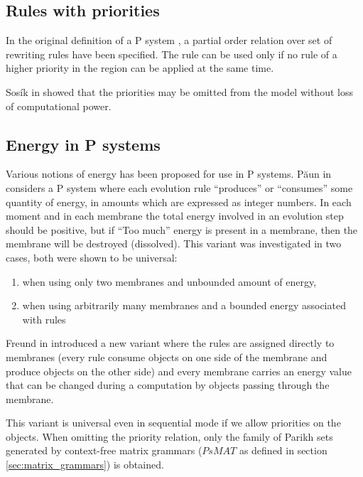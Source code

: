 
\subsection{Rules with priorities} %
\label{sub:rules_with_priorities}

In the original definition of a P system \cite{Paun98}, a partial order relation over set of rewriting rules have been specified. The rule can be used only if no rule of a higher priority in the region can be applied at the same time.

Sos\'ik in \cite{Sosik:2002:WithoutPriorities} showed that the priorities may be omitted from the model without loss of computational power.


\subsection{Energy in P systems} %
\label{sub:energy_in_p_systems}

Various notions of energy has been proposed for use in P systems. P\u{a}un in \cite{Paun:2001:Energy} considers a P system where each evolution rule ``produces'' or ``consumes'' some quantity of energy, in amounts which are expressed as integer numbers. In each moment and in each membrane the total energy involved in an evolution step should be positive, but if ``Too much'' energy is present in a membrane, then the membrane will be destroyed (dissolved). This variant was investigated in two cases, both were shown to be universal:

\begin{enumerate}
	\item when using only two membranes and unbounded amount of energy,
	\item when using arbitrarily many membranes and a bounded energy associated with rules
\end{enumerate}

Freund in \cite{Freund:2004:SequentialEnergy} introduced a new variant where the rules are assigned directly to membranes (every rule consume objects on one side of the membrane and produce objects on the other side) and every membrane carries an energy value that can be changed during a computation by objects passing through the membrane.

This variant is universal even in sequential mode if we allow priorities on the objects. When omitting the priority relation, only the family of Parikh sets generated by context-free matrix grammars ($PsMAT$ as defined in section \ref{sec:matrix_grammars}) is obtained.

